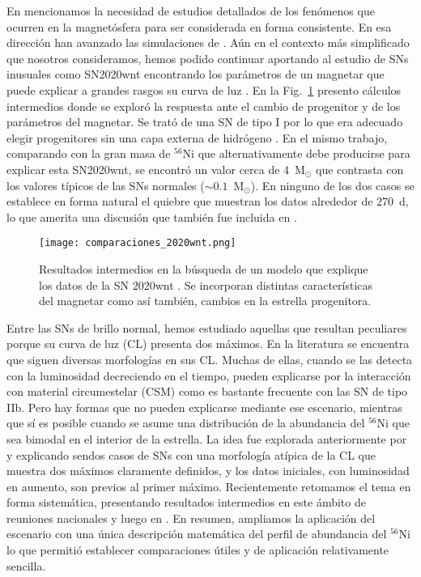 \documentclass[baaa]{baaa}
\begin{document}
En \cite{2016Orellana} mencionamos la necesidad de estudios detallados de los fenómenos que ocurren en la magnetósfera para ser considerada en forma consistente. En esa dirección han avanzado las simulaciones de \cite{2021Vurm}.
Aún en el contexto más simplificado que nosotros consideramos, hemos podido continuar aportando al estudio de SNs inusuales como SN2020wnt encontrando los parámetros de un magnetar que puede explicar a grandes rasgos su curva de luz \citep{2022Gutierrez}. En la Fig.~\ref{20wnt} presento cálculos intermedios donde se exploró la respuesta ante el cambio de progenitor y de los parámetros del magnetar. Se trató de una SN de tipo I por lo que era adecuado elegir progenitores sin una capa externa de hidrógeno \cite{2016Fola}. En el mismo trabajo, comparando con la gran masa de $^{56}$Ni que alternativamente debe producirse para explicar esta SN2020wnt, se encontró un valor cerca de 4~M$_{\odot}$ que contrasta con los valores típicos de las SNs normales ($\sim 0.1$~M$_{\odot}$). En ninguno de los dos casos se establece en forma natural el quiebre que muestran los datos alrededor de 270~d, lo que amerita una discusión que también fue incluida en \cite{2022Gutierrez}.\\

\begin{figure}[!h]
\centering
\texttt{[image: comparaciones\_2020wnt.png]}
\caption{Resultados intermedios en la búsqueda de un modelo que explique los datos de la SN 2020wnt \citep{2022Gutierrez}. Se incorporan distintas características del magnetar como así también, cambios en la estrella progenitora.} 
\label{20wnt}
\end{figure}


Entre las SNs de brillo normal, hemos estudiado aquellas que resultan peculiares porque su curva de luz (CL) presenta dos máximos. En la literatura se encuentra que siguen diversas morfologías en sus CL.
Muchas de ellas, cuando se las detecta con la luminosidad decreciendo en el tiempo, pueden explicarse por la interacción con material circumestelar (CSM) como es bastante frecuente con las SN de tipo IIb. 
Pero hay formas que no pueden explicarse mediante ese escenario, mientras que sí es posible cuando se asume una distribución de la abundancia del $^{56}$Ni que sea bimodal en el interior de la estrella.
La idea fue explorada anteriormente por \citep{Folatelli06} y \cite{Gutierrez2021} explicando sendos casos de SNs con una morfología atípica de la CL que muestra dos máximos claramente definidos, y los datos iniciales, con luminosidad en aumento, son previos al primer máximo.
Recientemente retomamos el tema en forma sistemática, presentando resultados intermedios en este ámbito de reuniones nacionales \citep{2021baaa_mio,2023baaa_mio} y luego en \cite{2022Orellana}. En resumen, ampliamos la aplicación del escenario con una única descripción matemática del perfil de abundancia del $^{56}$Ni lo que permitió establecer comparaciones útiles y de aplicación relativamente sencilla.
\end{document}
